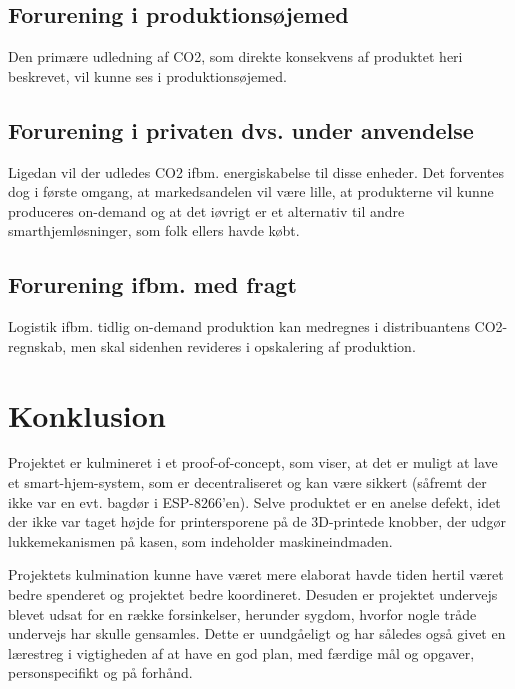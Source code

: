 \documentclass[11pt]{article}
\begin{document}
\subsection{Forurening i produktionsøjemed}
Den primære udledning af CO2, som direkte konsekvens af produktet heri beskrevet, vil kunne ses i produktionsøjemed.
\subsection{Forurening i privaten dvs. under anvendelse}
Ligedan vil der udledes CO2 ifbm. energiskabelse til disse enheder. Det forventes dog i første omgang, at markedsandelen vil være lille, at produkterne vil kunne produceres on-demand og at det iøvrigt er et alternativ til andre smarthjemløsninger, som folk ellers havde købt.
\subsection{Forurening ifbm. med fragt}
Logistik ifbm. tidlig on-demand produktion kan medregnes i distribuantens CO2-regnskab, men skal sidenhen revideres i opskalering af produktion. 

\newpage
\section{Konklusion}
\label{sec:org7454aed}
Projektet er kulmineret i et proof-of-concept, som viser, at det er muligt at lave et smart-hjem-system, som er decentraliseret og kan være sikkert (såfremt der ikke var en evt. bagdør i ESP-8266'en). Selve produktet er en anelse defekt, idet der ikke var taget højde for printersporene på de 3D-printede knobber, der udgør lukkemekanismen på kasen, som indeholder maskineindmaden.

Projektets kulmination kunne have været mere elaborat havde tiden hertil været bedre spenderet og projektet bedre koordineret. Desuden er projektet undervejs blevet udsat for en række forsinkelser, herunder sygdom, hvorfor nogle tråde undervejs har skulle gensamles. Dette er uundgåeligt og har således også givet en lærestreg i vigtigheden af at have en god plan, med færdige mål og opgaver, personspecifikt og på forhånd.

\newpage
\printbibliography
\end{document}
